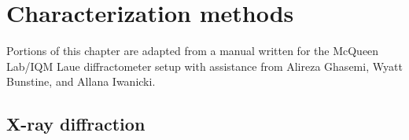 \chapter{Characterization methods} \label{chap:chap-3}



\begin{singlespace}         %
    Portions of this chapter are adapted from a manual written for the McQueen Lab/IQM Laue diffractometer setup with assistance from Alireza Ghasemi, Wyatt Bunstine, and Allana Iwanicki.

\end{singlespace} 
\section{X-ray diffraction}
